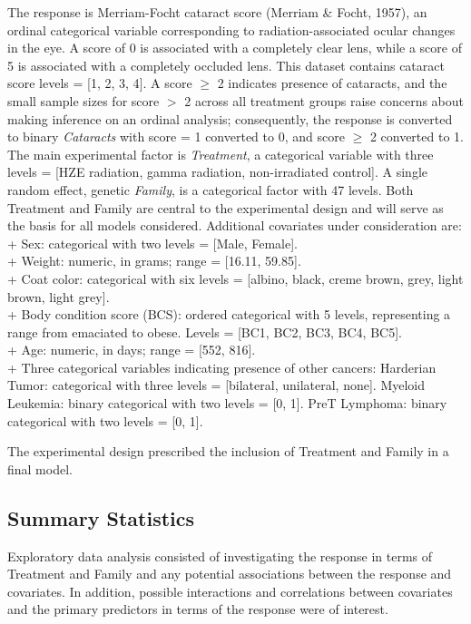 \documentclass[
]{article}
\begin{document}
The response is Merriam-Focht cataract score (Merriam \& Focht, 1957),
an ordinal categorical variable corresponding to radiation-associated
ocular changes in the eye. A score of 0 is associated with a completely
clear lens, while a score of 5 is associated with a completely occluded
lens. This dataset contains cataract score levels = {[}1, 2, 3, 4{]}. A
score \(\ge\) 2 indicates presence of cataracts, and the small sample
sizes for score \(>\) 2 across all treatment groups raise concerns about
making inference on an ordinal analysis; consequently, the response is
converted to binary \emph{Cataracts} with score = 1 converted to 0, and
score \(\ge\) 2 converted to 1. The main experimental factor is
\emph{Treatment}, a categorical variable with three levels = {[}HZE
radiation, gamma radiation, non-irradiated control{]}. A single random
effect, genetic \emph{Family}, is a categorical factor with 47 levels.
Both Treatment and Family are central to the experimental design and
will serve as the basis for all models considered. Additional covariates
under consideration are:\\
+ Sex: categorical with two levels = {[}Male, Female{]}.\\
+ Weight: numeric, in grams; range = {[}16.11, 59.85{]}.\\
+ Coat color: categorical with six levels = {[}albino, black, creme
brown, grey, light brown, light grey{]}.\\
+ Body condition score (BCS): ordered categorical with 5 levels,
representing a range from emaciated to obese. Levels = {[}BC1, BC2, BC3,
BC4, BC5{]}.\\
+ Age: numeric, in days; range = {[}552, 816{]}.\\
+ Three categorical variables indicating presence of other cancers:
Harderian Tumor: categorical with three levels = {[}bilateral,
unilateral, none{]}. Myeloid Leukemia: binary categorical with two
levels = {[}0, 1{]}. PreT Lymphoma: binary categorical with two levels =
{[}0, 1{]}.

The experimental design prescribed the inclusion of Treatment and Family
in a final model.

\hypertarget{summary-statistics}{%
\subsection{Summary Statistics}\label{summary-statistics}}

Exploratory data analysis consisted of investigating the response in
terms of Treatment and Family and any potential associations between the
response and covariates. In addition, possible interactions and
correlations between covariates and the primary predictors in terms of
the response were of interest.
\end{document}
